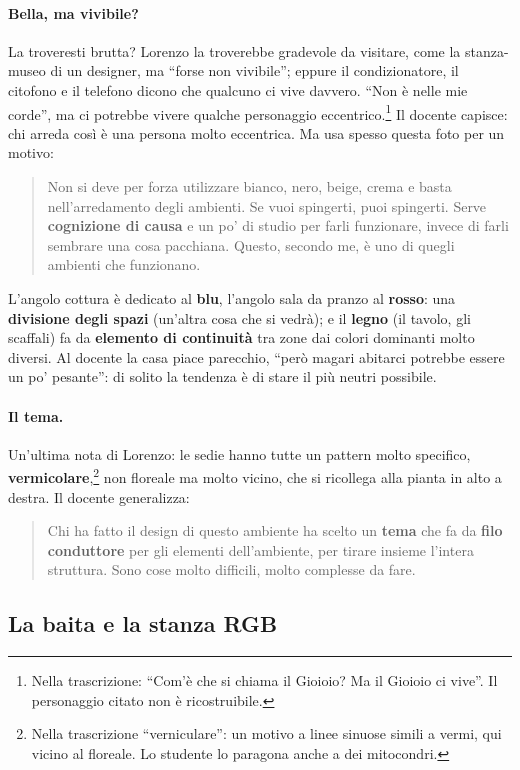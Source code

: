 \paragraph{Bella, ma vivibile?} La troveresti brutta? Lorenzo la troverebbe gradevole da
visitare, come la stanza-museo di un designer, ma ``forse non vivibile''; eppure il
condizionatore, il citofono e il telefono dicono che qualcuno ci vive davvero. ``Non è
nelle mie corde'', ma ci potrebbe vivere qualche personaggio eccentrico.\footnote{Nella
trascrizione: ``Com'è che si chiama il Gioioio? Ma il Gioioio ci vive''. Il personaggio
citato non è ricostruibile.} Il docente capisce: chi arreda così è una persona molto
eccentrica. Ma usa spesso questa foto per un motivo:
\begin{quote}
Non si deve per forza utilizzare bianco, nero, beige, crema e basta nell'arredamento degli
ambienti. Se vuoi spingerti, puoi spingerti. Serve \textbf{cognizione di causa} e un po' di
studio per farli funzionare, invece di farli sembrare una cosa pacchiana. Questo, secondo
me, è uno di quegli ambienti che funzionano.
\end{quote}
L'angolo cottura è dedicato al \textbf{blu}, l'angolo sala da pranzo al \textbf{rosso}:
una \textbf{divisione degli spazi} (un'altra cosa che si vedrà); e il \textbf{legno} (il
tavolo, gli scaffali) fa da \textbf{elemento di continuità} tra zone dai colori dominanti
molto diversi. Al docente la casa piace parecchio, ``però magari abitarci potrebbe essere
un po' pesante'': di solito la tendenza è di stare il più neutri possibile.

\paragraph{Il tema.} Un'ultima nota di Lorenzo: le sedie hanno tutte un pattern molto
specifico, \textbf{vermicolare},\footnote{Nella trascrizione ``verniculare'': un motivo
a linee sinuose simili a vermi, qui vicino al floreale. Lo studente lo paragona anche a dei
mitocondri.} non floreale ma molto vicino, che si ricollega alla pianta in alto a destra.
Il docente generalizza:
\begin{quote}
Chi ha fatto il design di questo ambiente ha scelto un \textbf{tema} che fa da
\textbf{filo conduttore} per gli elementi dell'ambiente, per tirare insieme l'intera
struttura. Sono cose molto difficili, molto complesse da fare.
\end{quote}

\subsection{La baita e la stanza RGB}

